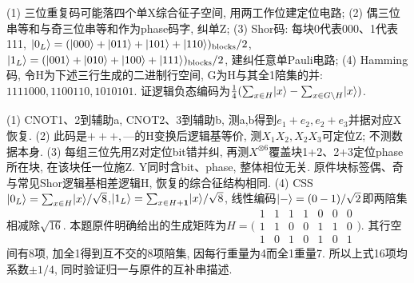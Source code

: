 \begin{exercise}(1) 三位重复码可能落四个单X综合征子空间, 用两工作位建定位电路; (2) 偶三位串等和与奇三位串等和作为phase码字, 纠单Z; (3) Shor码: 每块0代表000、1代表111, $\lvert 0_L\rangle=(\lvert 000\rangle+\lvert 011\rangle+\lvert 101\rangle+\lvert 110\rangle)_{\rm blocks}/2$, $\lvert 1_L\rangle=(\lvert 001\rangle+\lvert 010\rangle+\lvert 100\rangle+\lvert 111\rangle)_{\rm blocks}/2$, 建纠任意单Pauli电路; (4) Hamming码, 令H为下述三行生成的二进制行空间, G为H与其全1陪集的并: $1111000,1100110,1010101$. 证逻辑负态编码为$\frac14(\sum_{x\in H}\lvert x\rangle-\sum_{x\in G\setminus H}\lvert x\rangle)$.\end{exercise}
\begin{solution}(1) CNOT1、2到辅助a, CNOT2、3到辅助b, 测a,b得到$e_1+e_2,e_2+e_3$并据对应X恢复. (2) 此码是$+++,$---的H变换后逻辑基等价, 测$X_1X_2,X_2X_3$可定位Z; 不测数据本身. (3) 每组三位先用Z对定位bit错并纠, 再测$X^{\otimes6}$覆盖块1+2、2+3定位phase所在块, 在该块任一位施Z. Y同时含bit、phase, 整体相位无关. 原件块标签偶、奇与常见Shor逻辑基相差逻辑H, 恢复的综合征结构相同. (4) CSS$\lvert 0_L\rangle=\sum_{x\in H}\lvert x\rangle/\sqrt8$,$\lvert 1_L\rangle=\sum_{x\in H+\mathbf1}\lvert x\rangle/\sqrt8$, 线性编码$\lvert -\rangle=(0-1)/\sqrt2$即两陪集相减除$\sqrt{16}$. 本题原件明确给出的生成矩阵为$H=\bigl(\begin{smallmatrix}1&1&1&1&0&0&0\\1&1&0&0&1&1&0\\1&0&1&0&1&0&1\end{smallmatrix}\bigr)$. 其行空间有8项, 加全1得到互不交的8项陪集, 因每行重量为4而全1重量7. 所以上式16项均系数$\pm1/4$, 同时验证归一与原件的互补串描述.
\end{solution}

